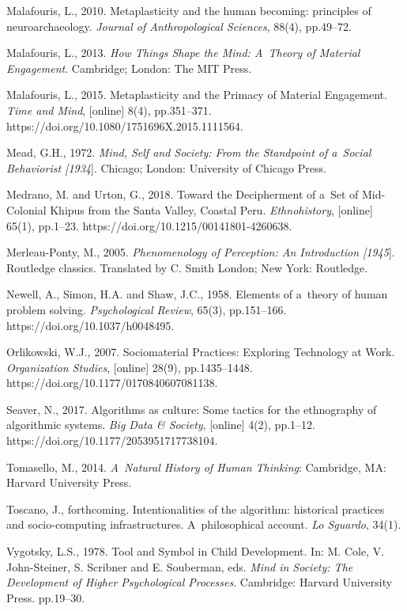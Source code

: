 Malafouris, L., 2010. Metaplasticity and the human becoming: principles of neuroarchaeology. \textit{Journal of Anthropological Sciences}, 88(4), pp.49–72.

Malafouris, L., 2013. \textit{How Things Shape the Mind: A~Theory of Material Engagement}. Cambridge; London: The MIT Press.

Malafouris, L., 2015. Metaplasticity and the Primacy of Material Engagement. \textit{Time and Mind}, [online] 8(4), pp.351–371. https://doi.org/10.1080/1751696X.2015.1111564.

Mead, G.H., 1972. \textit{Mind, Self and Society: From the Standpoint of a~Social Behaviorist [1934}]. Chicago; London: University of Chicago Press.

Medrano, M. and Urton, G., 2018. Toward the Decipherment of a~Set of Mid-Colonial Khipus from the Santa Valley, Coastal Peru. \textit{Ethnohistory}, [online] 65(1), pp.1–23. https://doi.org/10.1215/00141801-4260638.

Merleau-Ponty, M., 2005. \textit{Phenomenology of Perception: An Introduction [1945}]. Routledge classics. Translated by C. Smith London; New York: Routledge.

Newell, A., Simon, H.A. and Shaw, J.C., 1958. Elements of a~theory of human problem solving. \textit{Psychological Review}, 65(3), pp.151–166. https://doi.org/10.1037/h0048495.

Orlikowski, W.J., 2007. Sociomaterial Practices: Exploring Technology at Work. \textit{Organization Studies}, [online] 28(9), pp.1435–1448. https://doi.org/10.1177/0170840607081138.

Seaver, N., 2017. Algorithms as culture: Some tactics for the ethnography of algorithmic systems. \textit{Big Data \& Society}, [online] 4(2), pp.1–12. https://doi.org/10.1177/2053951717738104.

Tomasello, M., 2014. \textit{A~Natural History of Human Thinking}: Cambridge, MA: Harvard University Press.

Toscano, J., forthcoming. Intentionalities of the algorithm: historical practices and socio-computing infrastructures. A~philosophical account. \textit{Lo Sguardo}, 34(1).

Vygotsky, L.S., 1978. Tool and Symbol in Child Development. In: M. Cole, V. John-Steiner, S. Scribner and E. Souberman, eds. \textit{Mind in Society: The Development of Higher Psychological Processes}. Cambridge: Harvard University Press. pp.19–30.

